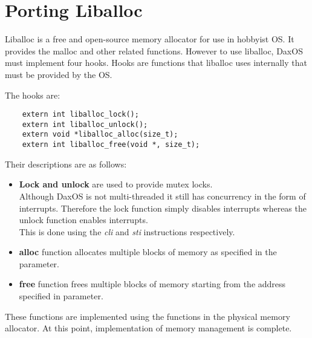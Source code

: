\section{Porting Liballoc}\label{section:Porting liballoc}

Liballoc is a free and open-source memory allocator for use in hobbyist OS. 
It provides the malloc and other related functions. However to use liballoc, DaxOS must implement four hooks.
Hooks are functions that liballoc uses internally that must be provided by the OS.

\vspace{0.3cm}
The hooks are:
\begin{lstlisting}
    extern int liballoc_lock();
    extern int liballoc_unlock();
    extern void *liballoc_alloc(size_t);
    extern int liballoc_free(void *, size_t);
\end{lstlisting}

Their descriptions are as follows:
\begin{itemize}
    \item \textbf{Lock and unlock} are used to provide mutex locks.\\
    Although DaxOS is not multi-threaded it still has concurrency in the form of interrupts.
    Therefore the lock function simply disables interrupts whereas the unlock function enables interrupts.\\
    This is done using the \textit{cli} and \textit{sti} instructions respectively.
    \item \textbf{alloc} function allocates multiple blocks of memory as specified in the parameter.
    \item \textbf{free} function frees multiple blocks of memory starting from the address specified in parameter.
\end{itemize}

These functions are implemented using the functions in the physical memory allocator.
At this point, implementation of memory management is complete.

